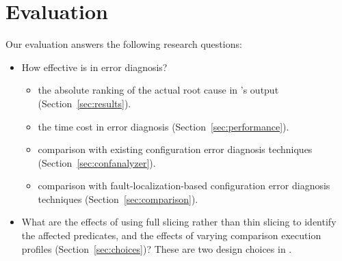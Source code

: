 \section{Evaluation}
\label{sec:evaluation}


Our evaluation answers the following research questions:



\begin{itemize}
\item How effective is \ourtool in error diagnosis?%
\begin{itemize}
  \item the absolute ranking of the actual root cause in \ourtool's output (Section~\ref{sec:results}).
  \item the time cost in error diagnosis (Section~\ref{sec:performance}).
  \item comparison with existing configuration error diagnosis techniques (Section~\ref{sec:confanalyzer}).
  \item comparison with fault-localization-based configuration error diagnosis techniques (Section~\ref{sec:comparison}).
\end{itemize}
\item What are the effects of using full slicing rather than thin slicing to identify
the affected predicates, and the effects of varying comparison execution profiles (Section~\ref{sec:choices})?
These are two design choices in \ourtool.
\end{itemize}

